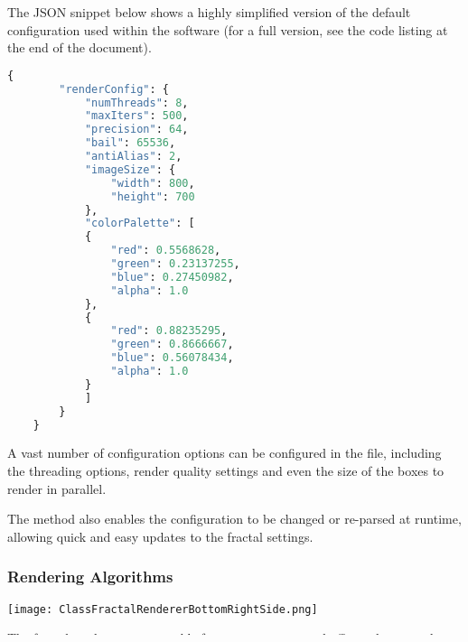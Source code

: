 \vspace{0.5cm}
\noindent
The JSON snippet below shows a highly simplified version of the default configuration used within the software (for a full version, see the code listing at the end of the document).

\begin{lstlisting}[language=python]
	{
		"renderConfig": {
			"numThreads": 8,
			"maxIters": 500,
			"precision": 64,
			"bail": 65536,
			"antiAlias": 2,
			"imageSize": {
				"width": 800,
				"height": 700
			},
			"colorPalette": [
			{
				"red": 0.5568628,
				"green": 0.23137255,
				"blue": 0.27450982,
				"alpha": 1.0
			},
			{
				"red": 0.88235295,
				"green": 0.8666667,
				"blue": 0.56078434,
				"alpha": 1.0
			}
			]
		}
	}
\end{lstlisting}

A vast number of configuration options can be configured in the file, including the threading options, render quality settings and even the size of the boxes to render in parallel.

The  method also enables the configuration to be changed or re-parsed at runtime, allowing quick and easy updates to the fractal settings.

\subsubsection{Rendering Algorithms}

\FloatBarrier
\begin{figure*}[htp]
	\centering
	\texttt{[image: ClassFractalRendererBottomRightSide.png]}
\end{figure*}
\FloatBarrier

The fractal renderer is responsible for creating an image buffer and setting the colour of each pixel in that image to represent the fractal at that location. Doing this efficiently is difficult, so the process is split into many small functions, providing fine-grained control over the algorithm.

\vspace{0.5cm}
\noindent
The following flowchart outlines the  method, which is explained in more detail below.
\vspace{0.5cm}

